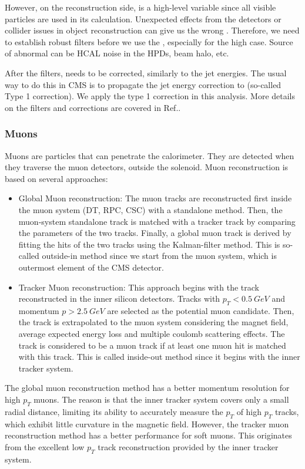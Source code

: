 However, on the reconstruction side, \MET is a high-level variable since all visible particles are used in its calculation. Unexpected effects from the detectors or collider issues in object reconstruction can give us the wrong \MET. Therefore, we need to establish robust \MET filters before we use the \MET, especially for the high \MET case. Source of abnormal \MET can be HCAL noise in the HPDs, beam halo, etc. 

After the filters, \MET needs to be corrected, similarly to the jet energies. The usual way to do this in CMS is to propagate the jet energy correction to \MET (so-called Type 1 correction). We apply the type 1 correction in this analysis. More details on the \MET filters and corrections are covered in Ref.\cite{CMS-PAS-JME-16-004}. 


\subsubsection{Muons}
Muons are particles that can penetrate the calorimeter. They are detected when they traverse the muon detectors, outside the solenoid. Muon reconstruction is based on several approaches: 

\begin{itemize}
	\item Global Muon reconstruction: The muon tracks are reconstructed first inside the muon system (DT, RPC, CSC) with a standalone method. Then, the muon-system standalone track is matched with a tracker track by comparing the parameters of the two tracks. Finally, a global muon track is derived by fitting the hits of the two tracks using the Kalman-filter method\cite{Fruhwirth:1987fm}. This is so-called outside-in method since we start from the muon system, which is outermost element of the CMS detector. 
  \item Tracker Muon reconstruction: This approach begins with the track reconstructed in the inner silicon detectors. Tracks with $p_{T}<0.5~GeV$ and momentum $p>2.5~GeV$ are selected as the potential muon candidate. Then, the track is extrapolated to the muon system considering the magnet field, average expected energy loss and multiple coulomb scattering effects. The track is considered to be a muon track if at least one muon hit is matched with this track. This is called inside-out method since it begins with the inner tracker system. 
\end{itemize}

The global muon reconstruction method has a better momentum resolution for high $p_{T}$ muons. The reason is that the inner tracker system covers only a small radial distance, limiting its ability to accurately measure the $p_{T}$ of high $p_{T}$ tracks, which exhibit little curvature in the magnetic field. However, the tracker muon reconstruction method has a better performance for soft muons. This originates from the excellent low $p_{T}$ track reconstruction provided by the inner tracker system. 

